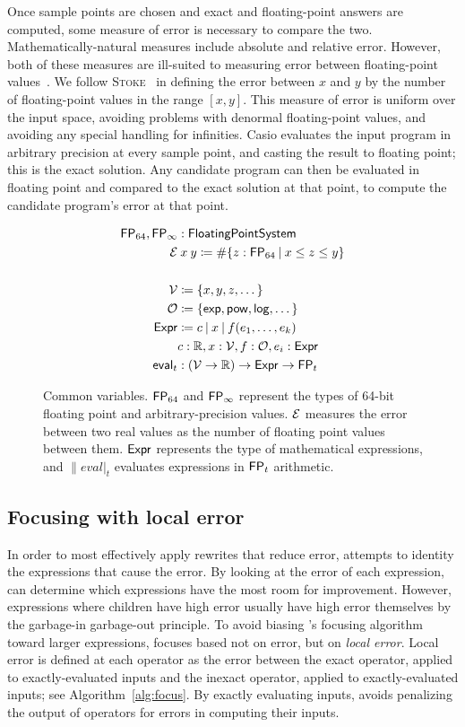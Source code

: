 \documentclass[paper.tex]{subfiles}
\begin{document}
Once sample points are chosen
  and exact and floating-point answers are computed,
  some measure of error is necessary to compare the two.
Mathematically-natural measures include absolute and relative error.
However, both of these measures are ill-suited
  to measuring error between floating-point values~\cite{}.
We follow \textsc{Stoke}~\cite{} in defining the error between $x$ and $y$
  by the number of floating-point values in the range $[x, y]$.
This measure of error is uniform over the input space,
  avoiding problems with denormal floating-point values,
  and avoiding any special handling for infinities.
Casio evaluates the input program in arbitrary precision at every sample point,
  and casting the result to floating point; this is the exact solution.
Any candidate program can then be evaluated in floating point
  and compared to the exact solution at that point,
  to compute the candidate program's error at that point.

\begin{figure}
\begin{align*}
  \FP_{64}, \FP_\infty &: \|FloatingPointSystem| \\
  \Err &\:x\:y \ceq \#\{ z : \FP_{64}\:|\:x \le z \le y \} \\
  \\
  \Var &\ceq \{ x, y, z, \dotsc \} \\
  \Op &\ceq \{ \|exp|, \|pow|, \|log|, \dotsc \} \\
  \Expr &\ceq c \I x \I f(e_1, \dotsc, e_k) \\
  & c : \RR, x : \Var, f : \Op, e_i : \Expr \\
  \|eval|_t &: (\Var \to \RR) \to \Expr \to \FP_t
\end{align*}
\caption{Common variables. $\mathsf{FP}_{64}$ and $\mathsf{FP}_\infty$ represent
  the types of 64-bit floating point and arbitrary-precision values.
  $\mathcal{E}$ measures the error between two real values
  as the number of floating point values between them.
  $\mathsf{Expr}$ represents the type of mathematical expressions,
  and $\|eval|_t$ evaluates expressions in $\mathsf{FP}_t$ arithmetic.}
\label{alg:defs}
\end{figure}

\subsection{Focusing with local error}

In order to most effectively apply rewrites that reduce error,
  \casio attempts to identity the expressions that cause the error.
By looking at the error of each expression,
  \casio can determine which expressions
  have the most room for improvement.
However, expressions where children have high error
  usually have high error themselves by
  the garbage-in garbage-out principle.
To avoid biasing \casio's focusing algorithm
  toward larger expressions, \casio focuses
  based not on error, but on \emph{local error}.
Local error is defined at each operator
  as the error between
  the exact operator, applied to exactly-evaluated inputs
  and the inexact operator, applied to exactly-evaluated inputs;
  see Algorithm~\ref{alg:focus}.
By exactly evaluating inputs,
  \casio avoids penalizing the output of operators
  for errors in computing their inputs.
\end{document}
